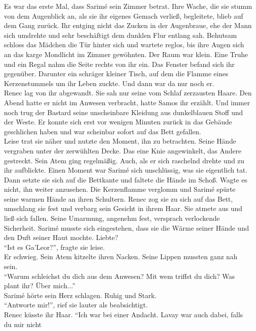 Es war das erste Mal, dass Sarimé sein Zimmer betrat. Ihre Wache, die sie stumm von dem Augenblick 
an, als sie ihr eigenes Gemach verließ, begleitete, blieb auf dem Gang zurück. Ihr entging nicht 
das Zucken in der Augenbraue, ehe der Mann sich umdrehte und sehr beschäftigt dem dunklen Flur 
entlang sah. Behutsam schloss das Mädchen die Tür hinter sich und wartete reglos, bis ihre Augen 
sich an das karge Mondlicht im Zimmer gewöhnten. Der Raum war klein. Eine Truhe und ein Regal nahm 
die Seite rechts von ihr ein. Das Fenster befand sich ihr gegenüber. Darunter ein schräger kleiner 
Tisch, auf dem die Flamme eines Kerzenstummels um ihr Leben zuckte. Und dann war da nur noch er.\\
Renec lag von ihr abgewandt. Sie sah nur seine vom Schlaf zerzausten Haare. Den Abend hatte er 
nicht im Anwesen verbracht, hatte Samos ihr erzählt. Und immer noch trug der Bastard seine 
unscheinbare Kleidung aus dunkelblauen Stoff und der Weste. Er konnte sich erst vor wenigen 
Minuten zurück in das Gebäude geschlichen haben und war scheinbar sofort auf das Bett gefallen.\\
Leise trat sie näher und nutzte den Moment, ihn zu betrachten. Seine Hände vergraben unter der 
zerwühlten Decke. Das eine Knie angewinkelt, das Andere gestreckt. Sein Atem ging regelmäßig. Auch, 
als er sich raschelnd drehte und zu ihr aufblickte. Einen Moment war Sarimé sich unschlüssig, was 
sie eigentlich tat. Dann setzte sie sich auf die Bettkante und faltete die Hände im Schoß. Wagte es 
nicht, ihn weiter anzusehen. Die Kerzenflamme verglomm und Sarimé spürte seine warmen Hände an 
ihren Schultern. Renec zog sie zu sich auf das Bett, umschlang sie fest und verbarg sein Gesicht in 
ihrem Haar. Sie atmete aus und ließ sich fallen. Seine Umarmung, angenehm fest, versprach 
verlockende Sicherheit. Sarimé musste sich eingestehen, dass sie die Wärme seiner Hände und den 
Duft seiner Haut mochte. Liebte?\\
``Ist es Ga'Leor?'', fragte sie leise.\\
Er schwieg. Sein Atem kitzelte ihren Nacken. Seine Lippen mussten ganz nah sein.\\
``Warum schleichst du dich aus dem Anwesen? Mit wem triffst du dich? Was plant 
ihr? Über mich...''\\
Sarimé hörte sein Herz schlagen. Ruhig und Stark.\\
``Antworte mir!'', rief sie lauter als beabsichtigt.\\
Renec küsste ihr Haar. ``Ich war bei einer Andacht. Lavay war auch dabei, falls du mir nicht 
